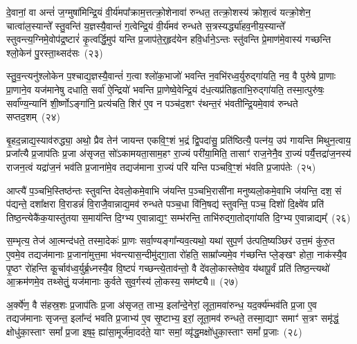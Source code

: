 {%
दे॒वानां॒ वा अन्तं॑ ज॒ग्मुषा॑मिन्द्रि॒यं वी॒र्य॑मपा᳚क्राम॒त्तत्क्रो॒शेनावा॑ रुन्धत॒ तत्क्रो॒शस्य॑ क्रोश॒त्वं यत्क्रो॒शेन॒ चात्वा॑ल॒स्यान्ते᳚ स्तु॒वन्ति॑ य॒ज्ञस्यै॒वान्तं॑ ग॒त्वेन्द्रि॒यं वी॒र्य॑मव॑ रुन्धते स॒त्रस्यर्द्ध्या॑हव॒नीय॒स्यान्ते᳚ स्तुवन्त्य॒ग्निमे॒वोप॑द्र॒ष्टारं॑ कृ॒त्वर्द्धि॒मुप॑ यन्ति प्र॒जा\-प॑ते॒र्॒\mbox{}हृद॑येन हवि॒र्धाने॒\-ऽन्तः स्तु॑वन्ति प्रे॒माण॑मे॒वास्य॑ गच्छन्ति श्लो॒केन॑ पु॒रस्ता॒थ्सद॑सः~(२३)

स्तु॒व॒न्त्यनु॑श्लोकेन प॒श्चाद्य॒ज्ञस्यै॒वान्तं॑ ग॒त्वा श्लो॑क॒भाजो॑ भवन्ति न॒वभि॑रध्व॒र्युरुद्गा॑यति॒ नव॒ वै पुरु॑षे प्रा॒णाः प्रा॒णाने॒व यज॑मानेषु दधाति॒ सर्वा॑ ऐ॒न्द्रियो॑ भवन्ति प्रा॒णेष्वे॒वेन्द्रि॒यं द॑ध॒त्यप्र॑तिहृताभि॒रुद्गा॑यति॒ तस्मा॒त्पुरु॑षः॒ सर्वा᳚ण्य॒न्यानि॑ शी॒र्ष्णो\-ऽङ्गा॑नि॒ प्रत्य॑चति॒ शिर॑ ए॒व न पञ्च॑द॒शꣳ र॑थन्त॒रं भ॑वतीन्द्रि॒यमे॒वाव॑ रुन्धते सप्तद॒शम्~(२४)

बृ॒हद॒न्नाद्य॒स्याव॑रुद्ध्या॒ अथो॒ प्रैव तेन॑ जायन्त एकवि॒ꣳ॒शं भ॒द्रं द्वि॒पदा॑सु॒ प्रति॑ष्ठित्यै॒ पत्न॑य॒ उप॑ गायन्ति मिथुन॒त्वाय॒ प्रजा᳚त्यै प्र॒जा\-प॑तिः प्र॒जा अ॑सृजत॒ सो॑\-ऽकामयता॒साम॒हꣳ रा॒ज्यं परी॑या॒मिति॒ तासाꣳ॑ राज॒नेनै॒व रा॒ज्यं पर्यै॒त्तद्रा॑ज॒नस्य॑ राजन॒त्वं यद्रा॑ज॒नं भव॑ति प्र॒जाना॑मे॒व तद्यज॑माना रा॒ज्यं परि॑ यन्ति पञ्चवि॒ꣳ॒शं भ॑वति प्र॒जा\-प॑तेः~(२५)

आप्त्यै॑ प॒ञ्चभि॒स्तिष्ठ॑न्तः स्तुवन्ति देवलो॒कमे॒वाभि ज॑यन्ति प॒ञ्चभि॒रासी॑ना मनुष्यलो॒कमे॒वाभि ज॑यन्ति॒ दश॒ सं प॑द्यन्ते॒ दशा᳚क्षरा वि॒राडन्नं॑ वि॒राजै॒वान्नाद्य॒मव॑ रुन्धते पञ्च॒धा वि॑नि॒षद्य॑ स्तुवन्ति॒ पञ्च॒ दिशो॑ दि॒क्ष्वे॑व प्रति॑ तिष्ठ॒न्त्येकै॑क॒यास्तु॑तया स॒माय॑न्ति दि॒ग्भ्य ए॒वान्नाद्य॒ꣳ॒ सम्भ॑रन्ति॒ ताभि॑रुद्गा॒तोद्गा॑यति दि॒ग्भ्य ए॒वान्नाद्यम्᳚~(२६)

स॒म्भृत्य॒ तेज॑ आ॒त्मन्द॑धते॒ तस्मा॒देकः॑ प्रा॒णः सर्वा॒ण्यङ्गा᳚न्यव॒त्यथो॒ यथा॑ सुप॒र्ण उ॑त्पति॒ष्यञ्छिर॑ उत्त॒मं कु॑रु॒त ए॒वमे॒व तद्यज॑मानाः प्र॒जाना॑मुत्त॒मा भ॑वन्त्यास॒न्दीमु॑द्गा॒ता रो॑हति॒ साम्रा᳚ज्यमे॒व ग॑च्छन्ति प्ले॒ङ्खꣳ होता॒ नाक॑स्यै॒व पृ॒ष्ठꣳ रो॑हन्ति कू॒र्चाव॑ध्व॒र्युर्ब्र॒ध्नस्यै॒व वि॒ष्टपं॑ गच्छन्त्ये॒ताव॑न्तो॒ वै दे॑वलो॒कास्तेष्वे॒व य॑थापू॒र्वं प्रति॑ तिष्ठ॒न्त्यथो॑ आ॒क्रम॑णमे॒व तथ्सेतुं॒ यज॑मानाः कुर्वते सुव॒र्गस्य॑ लो॒कस्य॒ सम॑ष्ट्यै॥~(२७)

{\anuvakamend[{सद॑सः सप्तद॒शं प्र॒जा\-प॑तेर्गायति दि॒ग्भ्य ए॒वान्नाद्यं॒ प्रत्येका॑\-दश च}]}%

अ॒र्क्ये॑ण॒ वै स॑हस्र॒शः प्र॒जा\-प॑तिः प्र॒जा अ॑सृजत॒ ताभ्य॒ इला᳚न्दे॒नेरां॒ लूता॒मवा॑रुन्ध॒ यद॒र्क्य॑म्भव॑ति प्र॒जा ए॒व तद्यज॑मानाः सृजन्त॒ इला᳚न्दं भवति प्र॒जाभ्य॑ ए॒व सृ॒ष्टाभ्य॒ इरां॒ लूता॒मव॑ रुन्धते॒ तस्मा॒द्याꣳ समाꣳ॑ स॒त्रꣳ समृ॑द्धं॒ क्षोधु॑का॒स्ताꣳ समां᳚ प्र॒जा इष॒ꣴ॒ ह्या॑सा॒मूर्ज॑मा॒दद॑ते॒ याꣳ समां॒ व्यृ॑द्ध॒मक्षो॑धुका॒स्ताꣳ समां᳚ प्र॒जाः~(२८)

}
